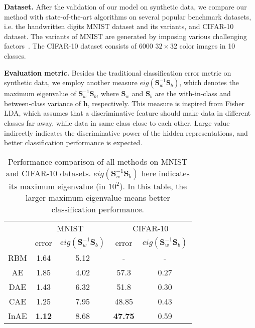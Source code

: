 \documentclass{article}
\def \h{\mathbf h}
\def \SSS{\mathbf S}
\begin{document}
{\bf Dataset.}
After the validation of our model on synthetic data,
we compare our method with state-of-the-art algorithms on several popular benchmark datasets,
i.e. the handwritten digits MNIST dataset and its variants, and CIFAR-10 dataset.
The variants of MNIST are generated by imposing various challenging factors~\cite{larochelle2007empirical}.
The CIFAR-10 dataset consists of 6000 $32\times32$ color images in 10 classes.

{\bf Evaluation metric.}
Besides the traditional classification error metric on synthetic data,
we employ another measure $eig(\SSS^{-1}_w\SSS_b)$,
which denotes the maximum eigenvalue of $\SSS^{-1}_w\SSS_b$,
where $\SSS_w$ and $\SSS_b$ are the with-in-class and between-class variance of $\h$, respectively.
This measure is inspired from Fisher LDA,
which assumes that
a discriminative feature should make data in different classes far away,
while data in same class close to each other.
Large value indirectly indicates the discriminative power of the hidden representations,
and better classification performance is expected.

\begin{table}[h]
\caption{Performance comparison of all methods on MNIST and CIFAR-10 datasets.
$eig(\SSS_w^{-1}\SSS_b)$ here indicates its maximum eigenvalue (in $10^2$).
In this table,
the larger maximum eigenvalue means better classification performance.}
\begin{center}
\begin{tabular}{c|c|c|c|c|}
\cline{2-5}
& \multicolumn{2}{|c|}{MNIST} & \multicolumn{2}{c|}{CIFAR-10} \\
\cline{2-5}
& error & $eig(\SSS_w^{-1}\SSS_b)$ & error & $eig(\SSS_w^{-1}\SSS_b)$ \\
\hline
\cline{1-5}
\multicolumn{1}{|c|}{RBM} & 1.64 & 5.12 & - & - \\
\cline{1-5}
\multicolumn{1}{|c|}{AE} & 1.85 & 4.02 & 57.3 & 0.27 \\
\cline{1-5}
\multicolumn{1}{|c|}{DAE} & 1.43 & 6.32 & 51.8 & 0.30 \\
\cline{1-5}
\multicolumn{1}{|c|}{CAE} & 1.25 & 7.95 & 48.85 & 0.43 \\
\cline{1-5}
\multicolumn{1}{|c|}{InAE} & \textbf{1.12} & 8.68 & \textbf{47.75} & 0.59 \\
\cline{1-5}
\end{tabular}
\end{center}
\label{tab:aa}
\end{table}
\end{document}
